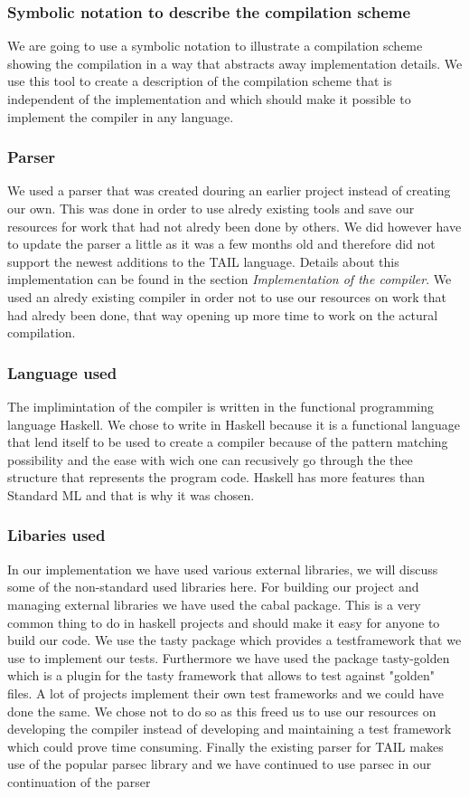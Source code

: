 \documentclass[11pt]{article}
\begin{document}
\subsubsection{Symbolic notation to describe the compilation scheme}
We are going to use a symbolic notation to illustrate a compilation scheme showing the compilation in a way that abstracts away implementation details. We use this tool to create a description of the compilation scheme that is independent of the implementation and which should make it possible to implement the compiler in any language.

\subsubsection{Parser}
We used a parser that was created douring an earlier project \cite{APLACC} instead of creating our own. This was done in order to use alredy existing tools and save our resources for work that had not alredy been done by others. We did however have to update the parser a little as it was a few months old and therefore did not support the newest additions to the TAIL language. Details about this implementation can be found in the section \textit{Implementation of the compiler}. 
We used an alredy existing compiler in order not to use our resources on work that had alredy been done, that way opening up more time to work on the actural compilation.

\subsubsection{Language used}
The implimintation of the compiler is written in the functional programming language Haskell. We chose to write 
in Haskell because it is a functional language that lend itself to be used to create a compiler because of the 
pattern matching possibility and the ease with wich one can recusively go through the thee structure that 
represents the program code. Haskell has more features than Standard ML and that is why it was chosen. 

\subsubsection{Libaries used}

In our implementation we have used various external libraries, we will discuss some of the non-standard used libraries here.
For building our project and managing external libraries we have used the cabal package. This is a very common thing to
do in haskell projects and should make it easy for anyone to build our code.
We use the tasty package which provides a testframework that we use to implement our tests. Furthermore we have used the
package tasty-golden which is a plugin for the tasty framework that allows to test against "golden" files.
A lot of projects implement their own test frameworks and we could have done the same.
We chose not to do so as this freed us to use our resources on developing the compiler instead of developing and maintaining a
test framework which could prove time consuming.
Finally the existing parser for TAIL makes use of the popular parsec library and we have continued to use parsec in our continuation
of the parser
\end{document}
